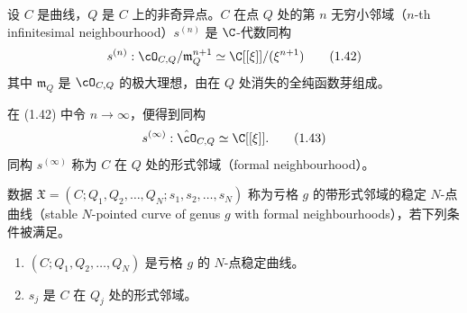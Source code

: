 \begin{definition}[1.18]
设 $C$ 是曲线，$Q$ 是 $C$ 上的非奇异点。$C$ 在点 $Q$ 处的第 $n$ 无穷小邻域（$n$-th infinitesimal neighbourhood）$s^{(n)}$ 是 $\C$-代数同构
\begin{equation}
s^{(n)}:\cO_{C,Q}/\mathfrak{m}_Q^{n+1}\simeq\C[[\xi]]/(\xi^{n+1}) \tag{1.42}
\end{equation}
其中 $\mathfrak{m}_Q$ 是 $\cO_{C,Q}$ 的极大理想，由在 $Q$ 处消失的全纯函数芽组成。
\end{definition}



在 (1.42) 中令 $n\to\infty$，便得到同构
\begin{equation}
s^{(\infty)}:\hat\cO_{C,Q}\simeq\C[[\xi]]. \tag{1.43}
\end{equation}
同构 $s^{(\infty)}$ 称为 $C$ 在 $Q$ 处的形式邻域（formal neighbourhood）。


\begin{definition}[1.19]
数据 $\mathfrak{X}=(C;Q_1,Q_2,\dots,Q_N;s_1,s_2,\dots,s_N)$ 称为亏格 $g$ 的带形式邻域的稳定 $N$-点曲线（stable $N$-pointed curve of genus $g$ with formal neighbourhoods），若下列条件被满足。
\begin{enumerate}[label=(\arabic*)]
\item $(C;Q_1,Q_2,\dots,Q_N)$ 是亏格 $g$ 的 $N$-点稳定曲线。
\item $s_j$ 是 $C$ 在 $Q_j$ 处的形式邻域。
\end{enumerate}
\end{definition}

